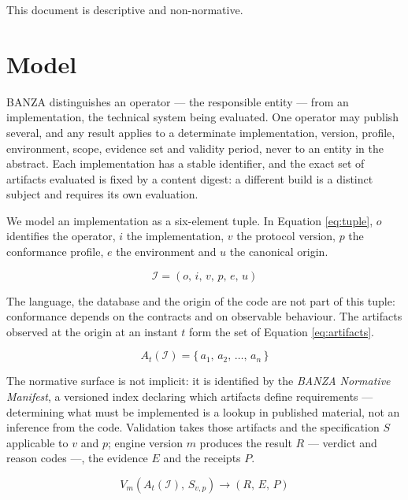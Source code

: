 \documentclass[journal abbreviation, manuscript]{copernicus}
\begin{document}
This document is descriptive and non-normative.


\section{Model}\label{sec:model}

BANZA distinguishes an operator --- the responsible entity --- from an implementation, the technical system being evaluated. One operator may publish several, and any result applies to a determinate implementation, version, profile, environment, scope, evidence set and validity period, never to an entity in the abstract. Each implementation has a stable identifier, and the exact set of artifacts evaluated is fixed by a content digest: a different build is a distinct subject and requires its own evaluation.

We model an implementation as a six-element tuple. In Equation \eqref{eq:tuple}, \(o\) identifies the operator, \(i\) the implementation, \(v\) the protocol version, \(p\) the conformance profile, \(e\) the environment and \(u\) the canonical origin.

\begin{equation}
\mathcal{I} = (o,\, i,\, v,\, p,\, e,\, u)
\tag{2}\label{eq:tuple}
\end{equation}

The language, the database and the origin of the code are not part of this tuple: conformance depends on the contracts and on observable behaviour. The artifacts observed at the origin at an instant \(t\) form the set of Equation \eqref{eq:artifacts}.

\begin{equation}
A_t(\mathcal{I}) = \{\, a_1,\, a_2,\, \dots,\, a_n \,\}
\tag{3}\label{eq:artifacts}
\end{equation}

The normative surface is not implicit: it is identified by the \emph{BANZA Normative Manifest}, a versioned index declaring which artifacts define requirements --- determining what must be implemented is a lookup in published material, not an inference from the code. Validation takes those artifacts and the specification \(S\) applicable to \(v\) and \(p\); engine version \(m\) produces the result \(R\) --- verdict and reason codes ---, the evidence \(E\) and the receipts \(P\).

\begin{equation}
V_m\!\left(A_t(\mathcal{I}),\, S_{v,p}\right) \rightarrow (R,\, E,\, P)
\tag{4}\label{eq:validation}
\end{equation}
\end{document}
